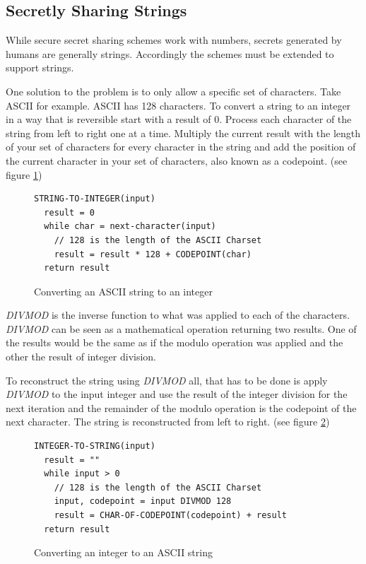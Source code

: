 \subsection{Secretly Sharing Strings}

While secure secret sharing schemes work with numbers, secrets generated by
humans are generally strings. Accordingly the schemes must be extended to
support strings.

One solution to the problem is to only allow a specific set of characters. Take
ASCII for example. ASCII has 128 characters. To convert a string to an integer
in a way that is reversible start with a result of 0. Process each character of
the string from left to right one at a time. Multiply the current result with
the length of your set of characters for every character in the string and add
the position of the current character in your set of characters, also known as
a codepoint. (see figure \ref{code:stringToInteger})

\begin{figure}
\begin{lstlisting}
STRING-TO-INTEGER(input)
  result = 0
  while char = next-character(input)
    // 128 is the length of the ASCII Charset
    result = result * 128 + CODEPOINT(char)
  return result
\end{lstlisting}
\caption{Converting an ASCII string to an integer}
\label{code:stringToInteger}
\end{figure}

\textit{DIVMOD} is the inverse function to what was applied to each of the
characters. \textit{DIVMOD} can be seen as a mathematical operation returning
two results. One of the results would be the same as if the modulo operation
was applied and the other the result of integer division.

To reconstruct the string using \textit{DIVMOD} all, that has to be done is
apply \textit{DIVMOD} to the input integer and use the result of the integer
division for the next iteration and the remainder of the modulo operation is
the codepoint of the next character. The string is reconstructed from left to
right. (see figure \ref{code:integerToString})

\begin{figure}
\begin{lstlisting}
INTEGER-TO-STRING(input)
  result = ""
  while input > 0
    // 128 is the length of the ASCII Charset
    input, codepoint = input DIVMOD 128
    result = CHAR-OF-CODEPOINT(codepoint) + result
  return result
\end{lstlisting}
\caption{Converting an integer to an ASCII string}
\label{code:integerToString}
\end{figure}

